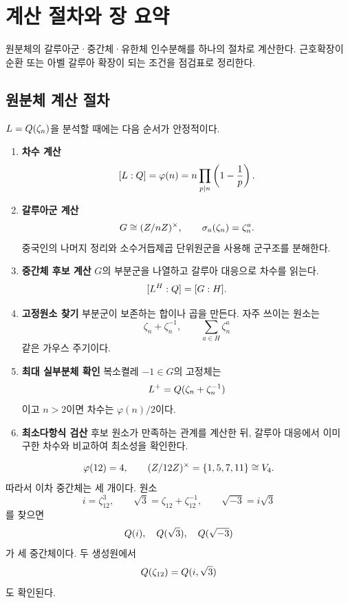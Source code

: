 \clearpage
\section{계산 절차와 장 요약}
\label{sec:cyclotomic-cyclic-workflow-review}

\begin{learninggoal}
원분체의 갈루아군·중간체·유한체 인수분해를 하나의 절차로 계산한다. 근호확장이 순환 또는 아벨 갈루아 확장이 되는 조건을 점검표로 정리한다.
\end{learninggoal}

\subsection{원분체 계산 절차}

$L=Q(\zeta_n)$을 분석할 때에는 다음 순서가 안정적이다.

\begin{enumerate}[label=\textbf{단계 \arabic*.},leftmargin=*]
  \item \textbf{차수 계산}
  \[
    [L:Q]=\varphi(n)
    =n\prod_{p\mid n}\left(1-\frac1p\right).
  \]

  \item \textbf{갈루아군 계산}
  \[
    G\cong(Z/nZ)^\times,
    \qquad
    \sigma_a(\zeta_n)=\zeta_n^a.
  \]
  중국인의 나머지 정리와 소수거듭제곱 단위원군을 사용해 군구조를 분해한다.

  \item \textbf{중간체 후보 계산}
  $G$의 부분군을 나열하고 갈루아 대응으로 차수를 읽는다.
  \[
    [L^H:Q]=[G:H].
  \]

  \item \textbf{고정원소 찾기}
  부분군이 보존하는 합이나 곱을 만든다. 자주 쓰이는 원소는
  \[
    \zeta_n+\zeta_n^{-1},
    \qquad
    \sum_{a\in H}\zeta_n^a
  \]
  같은 가우스 주기이다.

  \item \textbf{최대 실부분체 확인}
  복소켤레 $-1\in G$의 고정체는
  \[
    L^+=Q(\zeta_n+\zeta_n^{-1})
  \]
  이고 $n>2$이면 차수는 $\varphi(n)/2$이다.

  \item \textbf{최소다항식 검산}
  후보 원소가 만족하는 관계를 계산한 뒤, 갈루아 대응에서 이미 구한 차수와 비교하여 최소성을 확인한다.
\end{enumerate}

\begin{example}[절차 적용: $\Q(\zeta_{12})$]
\[
  \varphi(12)=4,
  \qquad
  (Z/12Z)^\times=\{1,5,7,11\}\cong V_4.
\]
따라서 이차 중간체는 세 개이다. 원소
\[
  i=\zeta_{12}^3,
  \qquad
  \sqrt3=\zeta_{12}+\zeta_{12}^{-1},
  \qquad
  \sqrt{-3}=i\sqrt3
\]
를 찾으면
\[
  Q(i),\quad Q(\sqrt3),\quad Q(\sqrt{-3})
\]
가 세 중간체이다. 두 생성원에서
\[
  Q(\zeta_{12})=Q(i,\sqrt3)
\]
도 확인된다.
\end{example}


